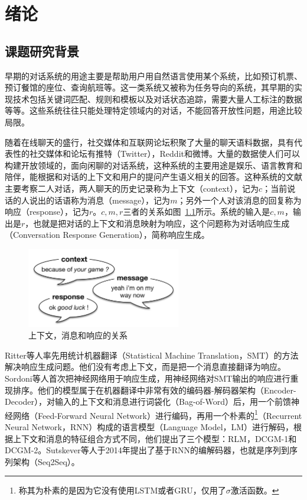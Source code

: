 
\chapter{绪论}\label{ch:绪论}

\section{课题研究背景}\label{sec:课题研究背景}
早期的对话系统的用途主要是帮助用户用自然语言使用某个系统，比如预订机票、预订餐馆的座位、查询航班等。这一类系统又被称为任务导向的系统，其早期的实现技术包括关键词匹配、规则和模板以及对话状态追踪，需要大量人工标注的数据等等。这些系统往往只能处理特定领域内的对话，不能回答开放性问题，用途比较局限。

随着在线聊天的盛行，社交媒体和互联网论坛积聚了大量的聊天语料数据，具有代表性的社交媒体和论坛有推特（Twitter），Reddit和微博。大量的数据使人们可以构建开放领域的，面向闲聊的对话系统，这种系统的主要用途是娱乐、语言教育和陪伴，能根据和对话的上下文和用户的提问产生语义相关的回答。这种系统的文献主要考察二人对话，两人聊天的历史记录称为上下文（context），记为$c$；当前说话的人说出的话语称为消息（message），记为$m$；另外一个人对该消息的回复称为响应（response），记为$r$。$c,m,r$三者的关系如图~\ref{fig:context_message_response}所示。系统的输入是$c,m$，输出是$r$，也就是把对话的上下文和消息映射为响应，这个问题称为对话响应生成（Conversation Response Generation），简称响应生成。

\begin{figure}[H]
    \includegraphics[width=0.6\textwidth]{figure/context_message_response.png}
    \centering
    \caption{上下文，消息和响应的关系}
    \label{fig:context_message_response}
\end{figure}

Ritter等人率先用统计机器翻译（Statistical Machine Translation，SMT）的方法解决响应生成问题。他们没有考虑上下文，而是把一个消息直接翻译为响应。Sordoni等人首次把神经网络用于响应生成，用神经网络对SMT输出的响应进行重现排序。他们的模型属于在机器翻译中非常有效的编码器-解码器架构（Encoder-Decoder），对输入的上下文和消息进行词袋化（Bag-of-Word）后，用一个前馈神经网络（Feed-Forward Neural Network）进行编码，再用一个朴素的\footnote{称其为朴素的是因为它没有使用LSTM或者GRU，仅用了$\sigma$激活函数。}（Recurrent Neural Network，RNN）构成的语言模型（Language Model，LM）进行解码，根据上下文和消息的特征组合方式不同，他们提出了三个模型：RLM，DCGM-1和DCGM-2。Sutskever等人于2014年提出了基于RNN的编解码器，也就是序列到序列架构（Seq2Seq）。


